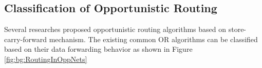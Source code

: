 


\subsection{Classification of Opportunistic Routing}
\label{bg:Opportunistic Networks:Classification of Opportunistic Routing}

Several researches proposed opportunistic routing algorithms based on store-carry-forward mechanism.
The existing common OR algorithms can be classified based on their data forwarding behavior as shown in Figure \ref{fig:bg:RoutingInOppNets} 

